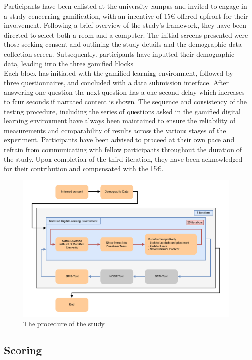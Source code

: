 Participants have been enlisted at the university campus and invited to engage in a study concerning gamification, with an incentive of 15€ offered upfront for their involvement.
Following a brief overview of the study's framework, they have been directed to select both a room and a computer.
The initial screens presented were those seeking consent and outlining the study details and the demographic data collection screen. Subsequently, participants have inputted their demographic data, leading into the three gamified blocks.\\
Each block has initiated with the gamified learning environment, followed by three questionnaires, and concluded with a data submission interface.
After answering one question the next question has a one-second delay which increases to four seconds if narrated content is shown.
The sequence and consistency of the testing procedure, including the series of questions asked in the gamified digital learning environment have always been maintained to ensure the reliability of measurements and comparability of results across the various stages of the experiment.
Participants have been advised to proceed at their own pace and refrain from communicating with fellow participants throughout the duration of the study.
Upon completion of the third iteration, they have been acknowledged for their contribution and compensated with the 15€.
\begin{figure}[H]
  \centering
  \includegraphics[width=\textwidth]{img/Procedure.pdf}
  \caption{The procedure of the study}
  \label{fig:figureProcedure}
\end{figure}

\subsection{Scoring}

